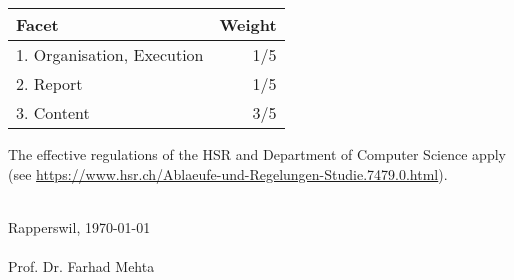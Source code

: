 \documentclass[a4paper]{article}
\begin{document}
\begin{center}
	\noindent
	\begin{tabulary}{1.0\textwidth}{| L | R |}
		\hline
		Facet & Weight \\ . Organisation, Execution	& 1/5 \\
		2. Report	& 1/5 \\
		3. Content	& 3/5 \\
		\hline
	\end{tabulary}
\end{center}


The effective regulations of the HSR and Department of Computer Science apply (see \url{https://www.hsr.ch/Ablaeufe-und-Regelungen-Studie.7479.0.html}).

\noindent
\vspace{2cm}\\
Rapperswil, \today\\
\vspace{1.5cm}\\
\noindent
Prof. Dr. Farhad Mehta




\end{document}
